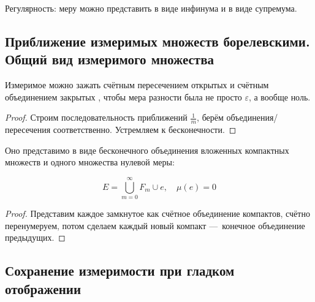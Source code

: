 \documentclass[12pt, a4paper, oneside]{memoir}
\begin{document}
Регулярность: меру можно представить в виде инфинума и в виде супремума.


\subsection{Приближение измеримых множеств борелевскими.
Общий вид измеримого множества}

\begin{theorem}

    Измеримое можно зажать счётным пересечением открытых и счётным объединением закрытых
    , чтобы мера разности была не просто $\varepsilon$, а вообще ноль.

    \begin{proof}
        Строим последовательность приближений $\frac{1}{m}$,
        берём объединения/пересечения соответственно.
        Устремляем к бесконечности.
    \end{proof}
\end{theorem}

\begin{corollary}

    Оно представимо в виде бесконечного объединения вложенных компактных множеств и одного множества нулевой меры:

    \begin{equation}
        E = \bigcup_{m = 0}^\infty F_m \cup e,  \quad \mu(e) = 0
    \end{equation}

    \begin{proof}
        Представим каждое замкнутое как счётное объединение компактов, счётно перенумеруем,
        потом сделаем каждый новый компакт — конечное объединение предыдущих.
    \end{proof}
\end{corollary}



\subsection{Сохранение измеримости при гладком отображении}
\end{document}

